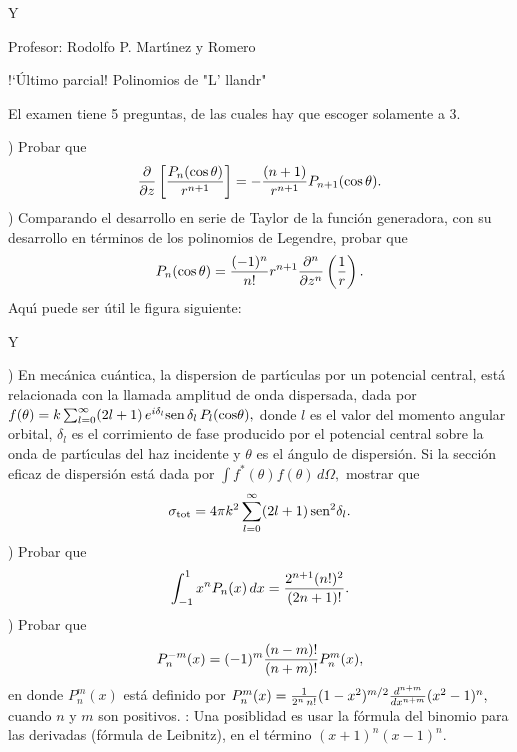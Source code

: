 



\let\picnaturalsize=N
\def\picsize{11cm}
\def\picfilename{FETI.eps}
\ifx\nopictures Y\else{\ifx\epsfloaded Y\else \fi
\global\let\epsfloaded=Y
{\ifx\picnaturalsize N\epsfxsize \picsize\fi \epsfbox{\picfilename}}}\fi

\centerline{\medio Profesor: Rodolfo P. Mart\'{\i}nez y Romero}\par
\centerline{\small \hoy}\par
\centerline{!`\'Ultimo parcial! Polinomios de "L' llandr"}
\smal
{\subt El examen tiene 5 preguntas, de las cuales hay que escoger solamente a 3.}\par
{})  Probar que 
 $$ {\partial\over\partial z}\left[{P_n(\cos\,\theta)\over r^{n + 1}}\right] = -{(n + 1)\over r^{n + 1}}P_{n + 1}(\cos \,\theta).$$
) Comparando el desarrollo en serie de Taylor de la funci\'on generadora, con su desarrollo en t\'erminos de los polinomios de {Legendre,} probar que 
$$P_n(\cos\,\theta) = {(-1)^n\over n!}r^{n + 1} {\partial^n\over \partial z^n}\left({1\over r}\right) .$$
\ni Aqu\'{\i}  puede ser \'util le figura siguiente:


\let\picnaturalsize=N
\def\picsize{5cm}
\def\picfilename{FETI598.eps}
\ifx\nopictures Y\else{\ifx\epsfloaded Y\else \fi
\global\let\epsfloaded=Y
\centerline{\ifx\picnaturalsize N\epsfxsize \picsize\fi \epsfbox{\picfilename}}}\fi

) En mec\'anica cu\'antica, la dispersion de part\'{\i}culas por un potencial central, est\'a relacionada con la llamada {\smali amplitud de onda dispersada,} dada por
$ f(\theta) = k \sum_{l=0}^\infty (2l + 1) \,e^{i\delta_l}\sen\,\delta_l \,P_l(\cos\theta),$
\ni donde $l$ es el valor del momento angular orbital, $\delta_l$ es el corrimiento de fase producido por el potencial central sobre la onda de part\'{\i}culas del haz incidente y $\theta$ es el \'angulo de dispersi\'on. Si la secci\'on eficaz de dispersi\'on est\'a dada por $\int f^*(\theta)f(\theta)\, d\Omega,$ mostrar que
$$ \sigma_{\rm tot} = 4\pi k^2 \sum_{l=0}^\infty (2l + 1)\, \sen^2\delta_l.$$
) Probar que 
$$ \int_{-1}^1 x^n P_n(x)\,dx = {2^{n + 1}(n!)^2\over (2n + 1)!}.$$
) Probar que 
$$ P_n^{-m}(x) = (-1)^m {(n - m)!\over (n+m)!}P_n^m(x),$$
\ni en donde $P_n^m(x) $ est\'a definido por $  P_n^m(x) = {1\over 2^n\,n!} (1-x^2)^{m/2}{d^{n + m}\over dx^{n+m}}(x^2 -1)^n,$ cuando $n$ y $m$ son positivos.
: Una posiblidad es usar la f\'ormula del binomio para las derivadas ({\smali f\'ormula de Leibnitz}), en el t\'ermino $(x +1)^n(x-1)^n$.\par

